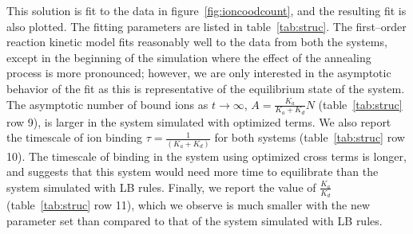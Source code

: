 \documentclass[12pt,openany,final]{book}
\begin{document}
This solution is fit to the data in figure~\ref{fig:ioncoodcount}, 
and the resulting fit is also plotted. 
The fitting parameters are listed in table~\ref{tab:struc}.
The first--order reaction kinetic model fits reasonably well to the 
data from both the systems, except in the beginning of
the simulation where the effect of the annealing process is more pronounced; 
however, we are only interested in the asymptotic
behavior of the fit as this is representative of the equilibrium state of the system. 
The asymptotic number of bound ions as $t\to\infty$, $A=\frac{K_{a}}{K_{a}+K_{d}} N$ 
(table~\ref{tab:struc} row 9), is larger in the system simulated with optimized terms.
We also report the timescale of ion binding $\tau=\frac{1}{\left(K_{a}+K_{d}\right)}$
for both systems (table~\ref{tab:struc} row 10). 
The timescale of binding in the system using optimized  cross terms is longer, 
and suggests that this system would need more time to equilibrate than the system simulated with LB rules.
Finally, we report the value of $\frac{K_a}{K_d}$ 
(table~\ref{tab:struc} row 11), which
we observe is much smaller with the new parameter set than compared to that
of the system simulated with LB rules.
\end{document}
